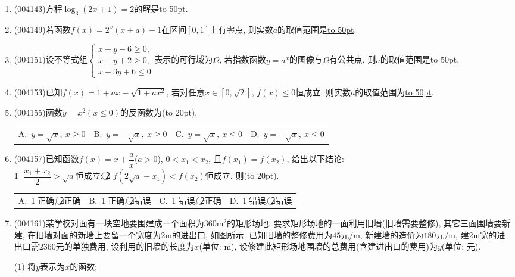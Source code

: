 \documentclass[10pt,a4paper]{article}
\newcommand{\blank}[1]{\underline{\hbox to #1pt{}}}
\newcommand{\bracket}[1]{(\hbox to #1pt{})}
\newcommand{\fourch}[4]{\par\begin{tabular}{p{.23\textwidth}p{.23\textwidth}p{.23\textwidth}p{.23\textwidth}}
A.~#1 &B.~#2& C.~#3& D.~#4
\end{tabular}}
\begin{document}
\begin{enumerate}[1.]
\item {\tiny (004143)}方程$\log_3(2x+1)=2$的解是\blank{50}.
\item {\tiny (004149)}若函数$f(x)=2^x(x+a)-1$在区间$[0,1]$上有零点, 则实数$a$的取值范围是\blank{50}.
\item {\tiny (004151)}设不等式组$\begin{cases} x+y-6\ge 0, \\ x-y+2\ge 0, \\ x-3y+6\le 0 \end{cases}$表示的可行域为$\Omega$, 若指数函数$y=a^x$的图像与$\Omega$有公共点, 则$a$的取值范围是\blank{50}.
\item {\tiny (004153)}已知$f(x)=1+ax-\sqrt{1+ax^2}$, 若对任意$x\in [0,\sqrt 2]$, $f(x)\le 0$恒成立, 则实数$a$的取值范围为\blank{50}.
\item {\tiny (004155)}函数$y=x^2(x\le 0)$的反函数为\bracket{20}.
\fourch{$y=\sqrt{x}, \ x\ge 0$}{$y=-\sqrt{x}, \ x\ge 0$}{$y=\sqrt{x}, \ x\le 0$}{$y=-\sqrt{x}, \ x\le 0$}
\item {\tiny (004157)}已知函数$f(x)=x+\dfrac ax$($a>0$), $0<x_1<x_2$, 且$f(x_1)=f(x_2)$, 给出以下结论:\\
\textcircled{1} $\dfrac{x_1+x_2}2>\sqrt a$恒成立; \textcircled{2} $f(2\sqrt a-x_1)<f(x_2)$恒成立. 则\bracket{20}.
\fourch{\textcircled{1}正确, \textcircled{2}正确}{\textcircled{1}正确, \textcircled{2}错误}{\textcircled{1}错误, \textcircled{2}正确}{\textcircled{1}错误, \textcircled{2}错误}
\item {\tiny (004161)}某学校对面有一块空地要围建成一个面积为$360\text{m}^2$的矩形场地, 要求矩形场地的一面利用旧墙(旧墙需要整修), 其它三面围墙要新建, 在旧墙对面的新墙上要留一个宽度为$2\text{m}$的进出口, 如图所示. 已知旧墙的整修费用为$45\text{元/m}$, 新建墙的造价为$180\text{元/m}$, 建$2\text{m}$宽的进出口需$2360$元的单独费用, 设利用的旧墙的长度为$x$(单位: $\text{m}$), 设修建此矩形场地围墙的总费用(含建进出口的费用)为$y$(单位: 元).\\
\begin{center}
\end{center}
(1) 将$y$表示为$x$的函数;\\

\end{enumerate}
\end{document}

